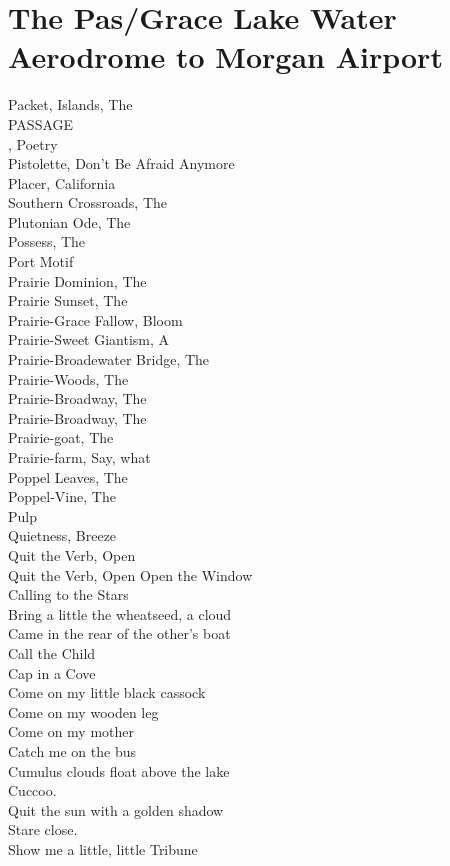 \documentclass[smalldemyvopaper,11pt,twoside,onecolumn,openright,extrafontsizes]{memoir}
\begin{document}
\chapter{The Pas/Grace Lake Water Aerodrome to Morgan Airport}
Packet, Islands, The
\\PASSAGE
\\, Poetry
\\Pistolette, Don't Be Afraid Anymore
\\Placer, California
\\Southern Crossroads, The
\\Plutonian Ode, The
\\Possess, The
\\Port Motif
\\Prairie Dominion, The
\\Prairie Sunset, The
\\Prairie-Grace Fallow, Bloom
\\Prairie-Sweet Giantism, A
\\Prairie-Broadewater Bridge, The
\\Prairie-Woods, The
\\Prairie-Broadway, The
\\Prairie-Broadway, The
\\Prairie-goat, The
\\Prairie-farm, Say, what
\\Poppel Leaves, The
\\Poppel-Vine, The
\\Pulp
\\Quietness, Breeze
\\Quit the Verb, Open
\\Quit the Verb, Open Open the Window
\\Calling to the Stars
\\Bring a little the wheatseed, a cloud
\\Came in the rear of the other's boat
\\Call the Child
\\Cap in a Cove
\\Come on my little black cassock
\\Come on my wooden leg
\\Come on my mother
\\Catch me on the bus
\\Cumulus clouds float above the lake
\\Cuccoo.
\\Quit the sun with a golden shadow
\\Stare close.
\\Show me a little, little Tribune
\end{document}

